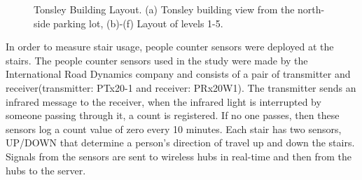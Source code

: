 \documentclass[../UNBThesis2.tex]{subfiles}
\begin{document}
\begin{itemize}
\begin{figure}[ht]
\caption{Tonsley Building Layout. (a) Tonsley building view from the north-side parking lot, (b)-(f) Layout of levels 1-5.}
\label{laay}
\end{figure}

In order to measure stair usage, people counter sensors were deployed at the stairs. The people counter sensors used in the study were made by the International Road Dynamics company and consists of a pair of transmitter and receiver(transmitter: PTx20-1 and receiver: PRx20W1). The transmitter sends an infrared message to the receiver, when the infrared light is interrupted by someone passing through it, a count is registered. If no one passes, then these sensors log a count value of zero every 10 minutes. Each stair has two sensors, UP/DOWN that determine a person's direction of travel up and down the stairs. Signals from the sensors are sent to wireless hubs in real-time and then from the hubs to the server. 






\end{itemize}
\end{document}
